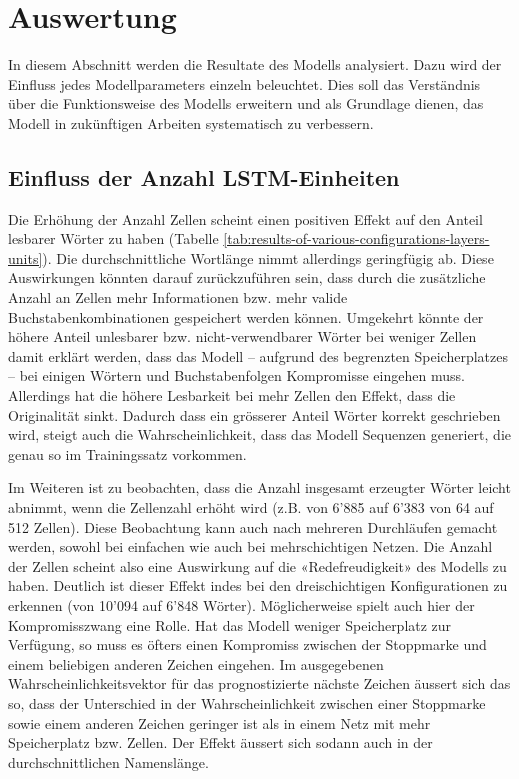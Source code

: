 \chapter{Auswertung}
\label{ch:analysis}

In diesem Abschnitt werden die Resultate des Modells analysiert.
Dazu wird der Einfluss jedes Modellparameters einzeln beleuchtet.
Dies soll das Verständnis über die Funktionsweise des Modells erweitern und als Grundlage dienen, das Modell in zukünftigen Arbeiten systematisch zu verbessern.


\section{Einfluss der Anzahl LSTM-Einheiten}
\label{sec:increase-lstm}

Die Erhöhung der Anzahl Zellen scheint einen positiven Effekt auf den Anteil lesbarer Wörter zu haben (Tabelle \ref{tab:results-of-various-configurations-layers-units}).
Die durchschnittliche Wortlänge nimmt allerdings geringfügig ab.
Diese Auswirkungen könnten darauf zurückzuführen sein, dass durch die zusätzliche Anzahl an Zellen mehr Informationen bzw. mehr valide Buchstabenkombinationen gespeichert werden können.
Umgekehrt könnte der höhere Anteil unlesbarer bzw. nicht-verwendbarer Wörter bei weniger Zellen damit erklärt werden,
dass das Modell – aufgrund des begrenzten Speicherplatzes – bei einigen Wörtern und Buchstabenfolgen Kompromisse eingehen muss.
Allerdings hat die höhere Lesbarkeit bei mehr Zellen den Effekt, dass die Originalität sinkt.
Dadurch dass ein grösserer Anteil Wörter korrekt geschrieben wird, steigt auch die Wahrscheinlichkeit, dass das Modell Sequenzen generiert, die genau so im Trainingssatz vorkommen.

Im Weiteren ist zu beobachten, dass die Anzahl insgesamt erzeugter Wörter leicht abnimmt, wenn die Zellenzahl erhöht wird (z.B. von 6'885 auf 6'383 von 64 auf 512 Zellen).
Diese Beobachtung kann auch nach mehreren Durchläufen gemacht werden, sowohl bei einfachen wie auch bei mehrschichtigen Netzen.
Die Anzahl der Zellen scheint also eine Auswirkung auf die «Redefreudigkeit» des Modells zu haben.
Deutlich ist dieser Effekt indes bei den dreischichtigen Konfigurationen zu erkennen (von 10'094 auf 6'848 Wörter).
Möglicherweise spielt auch hier der Kompromisszwang eine Rolle.
Hat das Modell weniger Speicherplatz zur Verfügung, so muss es öfters einen Kompromiss zwischen der Stoppmarke und einem beliebigen anderen Zeichen eingehen.
Im ausgegebenen Wahrscheinlichkeitsvektor für das prognostizierte nächste Zeichen äussert sich das so, dass der Unterschied in der Wahrscheinlichkeit zwischen einer Stoppmarke sowie einem
anderen Zeichen geringer ist als in einem Netz mit mehr Speicherplatz bzw. Zellen.
Der Effekt äussert sich sodann auch in der durchschnittlichen Namenslänge.

